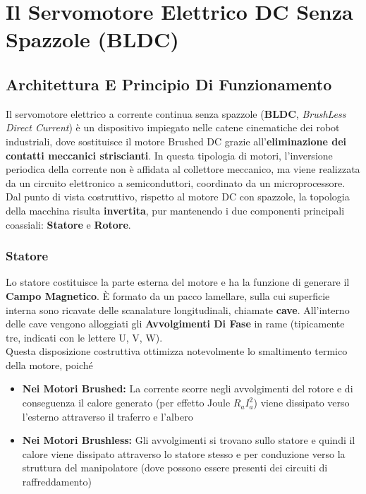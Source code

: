 ﻿\documentclass[11pt, a4paper]{article}
\begin{document}
\newpage



\newpage

\section{Il Servomotore Elettrico DC Senza Spazzole (BLDC)}

\subsection{Architettura E Principio Di Funzionamento}
Il servomotore elettrico a corrente continua senza spazzole (\textbf{BLDC}, \textit{BrushLess Direct Current}) è un dispositivo impiegato nelle catene cinematiche dei robot industriali, dove sostituisce il motore Brushed DC grazie all'\textbf{eliminazione dei contatti meccanici striscianti}. In questa tipologia di motori, l'inversione periodica della corrente non è affidata al collettore meccanico, ma viene realizzata da un circuito elettronico a semiconduttori, coordinato da un microprocessore.\\
Dal punto di vista costruttivo, rispetto al motore DC con spazzole, la topologia della macchina risulta \textbf{invertita}, pur mantenendo i due componenti principali coassiali: \textbf{Statore} e \textbf{Rotore}.

\subsubsection{Statore}
Lo statore costituisce la parte esterna del motore e ha la funzione di generare il \textbf{Campo Magnetico}. È formato da un pacco lamellare, sulla cui superficie interna sono ricavate delle scanalature longitudinali, chiamate \textbf{cave}. All'interno delle cave vengono alloggiati gli \textbf{Avvolgimenti Di Fase} in rame (tipicamente tre, indicati con le lettere U, V, W).\\
Questa disposizione costruttiva ottimizza notevolmente lo smaltimento termico della motore, poiché
\begin{itemize}
    \item \textbf{Nei Motori Brushed:} La corrente scorre negli avvolgimenti del rotore e di conseguenza il calore generato (per effetto Joule $R_a I_a^2$) viene dissipato verso l'esterno attraverso il traferro e l'albero
    \item \textbf{Nei Motori Brushless:} Gli avvolgimenti si trovano sullo statore e quindi il calore viene dissipato attraverso lo statore stesso e per conduzione verso la struttura del manipolatore (dove possono essere presenti dei circuiti di raffreddamento)
\end{itemize}
\end{document}
